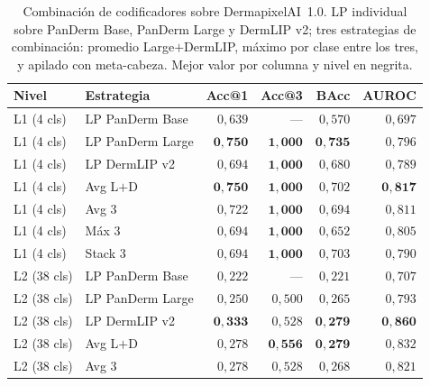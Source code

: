 \begin{table}[H]
\centering
\footnotesize
\setlength{\tabcolsep}{4pt}
\renewcommand{\arraystretch}{0.95}
\caption{Combinación de codificadores sobre DermapixelAI~1.0. LP
individual sobre PanDerm Base, PanDerm Large y DermLIP v2; tres
estrategias de combinación: promedio Large$+$DermLIP, máximo por
clase entre los tres, y apilado con meta-cabeza. Mejor valor por
columna y nivel en negrita.}
\label{tab:dermapixel-ensemble}
\begin{tabular}{llrrrr}
\hline
Nivel & Estrategia                         & Acc@1              & Acc@3              & BAcc               & AUROC \\
\hline
L1 (4 cls)   & LP PanDerm Base             & $0{,}639$          & ---                & $0{,}570$          & $0{,}697$ \\
L1 (4 cls)   & LP PanDerm Large            & $\mathbf{0{,}750}$ & $\mathbf{1{,}000}$ & $\mathbf{0{,}735}$ & $0{,}796$ \\
L1 (4 cls)   & LP DermLIP v2               & $0{,}694$          & $\mathbf{1{,}000}$ & $0{,}680$          & $0{,}789$ \\
L1 (4 cls)   & Avg L$+$D                   & $\mathbf{0{,}750}$ & $\mathbf{1{,}000}$ & $0{,}702$          & $\mathbf{0{,}817}$ \\
L1 (4 cls)   & Avg 3                       & $0{,}722$          & $\mathbf{1{,}000}$ & $0{,}694$          & $0{,}811$ \\
L1 (4 cls)   & Máx 3                       & $0{,}694$          & $\mathbf{1{,}000}$ & $0{,}652$          & $0{,}805$ \\
L1 (4 cls)   & Stack 3                     & $0{,}694$          & $\mathbf{1{,}000}$ & $0{,}703$          & $0{,}790$ \\
\hline
L2 (38 cls)  & LP PanDerm Base             & $0{,}222$          & ---                & $0{,}221$          & $0{,}707$ \\
L2 (38 cls)  & LP PanDerm Large            & $0{,}250$          & $0{,}500$          & $0{,}265$          & $0{,}793$ \\
L2 (38 cls)  & LP DermLIP v2               & $\mathbf{0{,}333}$ & $0{,}528$          & $\mathbf{0{,}279}$ & $\mathbf{0{,}860}$ \\
L2 (38 cls)  & Avg L$+$D                   & $0{,}278$          & $\mathbf{0{,}556}$ & $\mathbf{0{,}279}$ & $0{,}832$ \\
L2 (38 cls)  & Avg 3                       & $0{,}278$          & $0{,}528$          & $0{,}268$          & $0{,}821$ \\

\end{tabular}
\end{table}
